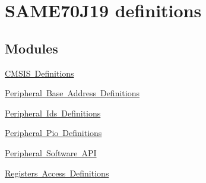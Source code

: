 \hypertarget{group__SAME70J19__definitions}{}\section{S\+A\+M\+E70\+J19 definitions}
\label{group__SAME70J19__definitions}
\subsection*{Modules}
\begin{DoxyCompactItemize}
\item 
\mbox{\hyperlink{group__SAME70J19__cmsis}{C\+M\+S\+I\+S Definitions}}
\item 
\mbox{\hyperlink{group__SAME70J19__base}{Peripheral Base Address Definitions}}
\item 
\mbox{\hyperlink{group__SAME70J19__id}{Peripheral Ids Definitions}}
\item 
\mbox{\hyperlink{group__SAME70J19__pio}{Peripheral Pio Definitions}}
\item 
\mbox{\hyperlink{group__SAME70J19__api}{Peripheral Software A\+PI}}
\item 
\mbox{\hyperlink{group__SAME70J19__reg}{Registers Access Definitions}}
\end{DoxyCompactItemize}
